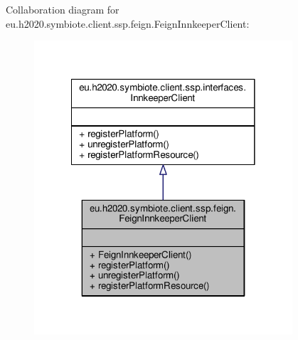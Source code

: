 Collaboration diagram for eu.\+h2020.\+symbiote.\+client.\+ssp.\+feign.\+Feign\+Innkeeper\+Client\+:
\nopagebreak
\begin{figure}[H]
\begin{center}
\leavevmode
\includegraphics[width=272pt]{classeu_1_1h2020_1_1symbiote_1_1client_1_1ssp_1_1feign_1_1FeignInnkeeperClient__coll__graph}
\end{center}
\end{figure}
